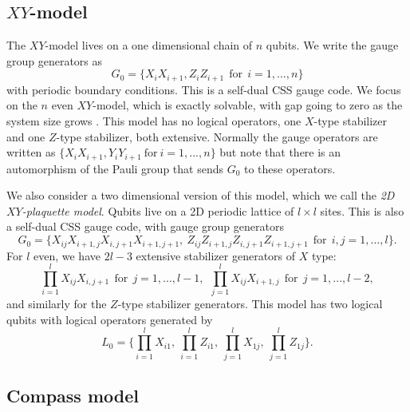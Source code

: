 \documentclass[a4paper,onecolumn,11pt,unpublished]{quantumarticle}
\begin{document}
\subsection{$XY$-model}\label{Sec41}

The $XY$-model \cite{Pfeuty1970}
lives on a one dimensional chain of $n$ qubits.
We write the gauge group generators as
$$
    G_0 = \{ X_i X_{i+1}, Z_i Z_{i+1}\ \ \mbox{for}\ \ i=1,...,n \}
$$
with periodic boundary conditions.
This is a self-dual CSS gauge code.
We focus on the $n$ even $XY$-model,
which is exactly solvable,
with gap going to zero as the system size grows \cite{Lieb1961}.
This model has no logical operators, one 
$X$-type stabilizer and one $Z$-type stabilizer,
both extensive.
Normally the gauge operators are written as 
$\{ X_i X_{i+1}, Y_i Y_{i+1} \ \mbox{for}\ i=1,...,n \}$
but note that there is an automorphism of the Pauli group
that sends $G_0$ to these operators.

We also consider a two dimensional version of this
model, which we call the \emph{2D $XY$-plaquette model}.
Qubits live on a 2D periodic lattice of $l\times l$ sites.
This is also a self-dual CSS gauge code, with 
gauge group generators 
$$
    G_0 = \{
        X_{ij}X_{i+1,j}X_{i,j+1}X_{i+1,j+1},\ 
        Z_{ij}Z_{i+1,j}Z_{i,j+1}Z_{i+1,j+1}
        \ \ \mbox{for}\ \ i,j=1,...,l \}.
$$
For $l$ even, we have $2l-3$ extensive stabilizer generators of $X$ type:
$$
    \prod_{i=1}^l X_{ij} X_{i,j+1} \ \ \mbox{for}\ \ j=1,...,l-1,\ \ 
    \prod_{j=1}^l X_{ij} X_{i+1,j} \ \ \mbox{for}\ \ j=1,...,l-2,
$$
and similarly for the $Z$-type stabilizer generators.
This model has two logical qubits with logical operators 
generated by
$$
    L_0 = \Big\{ 
            \prod_{i=1}^l X_{i1}, \ 
            \prod_{i=1}^l Z_{i1}, \ 
            \prod_{j=1}^l X_{1j},\ 
            \prod_{j=1}^l Z_{1j}
        \Big\}.
$$

\subsection{Compass model}\label{Sec43}
\end{document}

